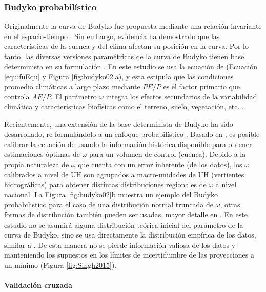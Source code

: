\documentclass[12pt]{article}
\begin{document}
\subsubsection{Budyko probabilístico}

Originalmente la curva de Budyko fue propuesta mediante una relación invariante en el espacio-tiempo \citep{Budyko1961,Pike1964}. Sin embargo, evidencia ha demostrado que las características de la cuenca y del clima afectan su posición en la curva. Por lo tanto, las diversas versiones paramétricas de la curva de Budyko tienen base determinista en su formulación \citep{Fu1981,Zhang2004,Zhang2008,Wang2014}. En este estudio se usa la ecuación de \citep{Fu1981} (Ecuación \ref{equ:fuEqu} y Figura \ref{fig:budyko02}a), y esta estipula que las condiciones promedio climáticas a largo plazo mediante $PE/P$ es el factor primario que controla $AE/P$. El parámetro $\omega$ integra los efectos secundarios de la variabilidad climática y características biofísicas como el terreno, suelo, vegetación, etc. \citep{Gentine2012,Berghuijs2014}.



Recientemente, una extensión de la base determinista de Budyko ha sido desarrollado, re-formulándolo a un enfoque probabilístico \citep{Greve2015}. Basado en \citet{Greve2015}, es posible calibrar la ecuación de \cite{Fu1981} usando la información histórica disponible para obtener estimaciones óptimas de $\omega$ para un volumen de control (cuenca). Debido a la propia naturaleza de $\omega$ que cuenta con un error inherente (de los datos), los $\omega$ calibrados a nivel de UH son agrupados a macro-unidades de UH (vertientes hidrográficas) para obtener distintas distribuciones regionales de $\omega$ a nivel nacional. La Figura \ref{fig:budyko02}b muestra un ejemplo del Budyko probabilistico para el caso de una distribución normal truncada de $\omega$, otras formas de distribución también pueden ser usadas, mayor detalle en \citet{Greve2015}. En este estudio no se asumirá alguna distribución teórica inicial del parámetro de la curva de Budyko, sino se usa directamente la distribución empírica de los datos, similar a \citet{Singh2015}. De esta manera no se pierde información valiosa de los datos y manteniendo los supuestos en los límites de incertidumbre de las proyecciones a un mínimo (Figura \ref{fig:Singh2015}).

\paragraph{Validación cruzada}\mbox{}
\end{document}

